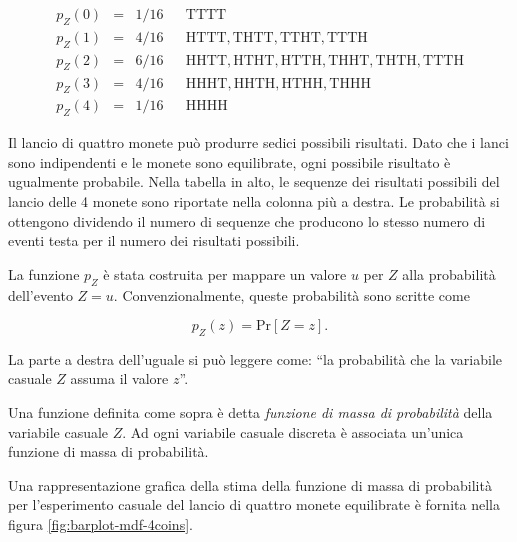 \documentclass[
  11pt,
]{krantz}
\theoremstyle{definition}
\theoremstyle{definition}
\theoremstyle{definition}
\theoremstyle{definition}
\theoremstyle{remark}
\begin{document}
\[
\begin{array}{rclll}
p_Z(0) & = & 1/16 & & \mathrm{TTTT}
\\
p_Z(1) & = & 4/16 & & \mathrm{HTTT, THTT, TTHT, TTTH}
\\
p_Z(2) & = & 6/16 & & \mathrm{HHTT, HTHT, HTTH, THHT, THTH, TTTH}
\\
p_Z(3) & = & 4/16 & & \mathrm{HHHT, HHTH, HTHH, THHH}
\\
p_Z(4) & = & 1/16 & & \mathrm{HHHH}
\end{array}
\]

Il lancio di quattro monete può produrre sedici possibili risultati. Dato che i lanci sono indipendenti e le monete sono equilibrate, ogni possibile risultato è ugualmente probabile. Nella tabella in alto, le sequenze dei risultati possibili del lancio delle 4 monete sono riportate nella colonna più a destra. Le probabilità si ottengono dividendo il numero di sequenze che producono lo stesso numero di eventi testa per il numero dei risultati possibili.

La funzione \(p_Z\) è stata costruita per mappare un valore \(u\) per \(Z\) alla probabilità dell'evento \(Z = u\). Convenzionalmente, queste probabilità sono scritte come

\[
p_Z(z) = \mbox{Pr}[Z = z].
\]

La parte a destra dell'uguale si può leggere come: ``la probabilità che la variabile casuale \(Z\) assuma il valore \(z\)''.

Una funzione definita come sopra è detta \emph{funzione di massa di probabilità} della variabile casuale \(Z\). Ad ogni variabile casuale discreta è associata un'unica funzione di massa di probabilità.

Una rappresentazione grafica della stima della funzione di massa di probabilità per l'esperimento casuale del lancio di quattro monete equilibrate è fornita nella figura \ref{fig:barplot-mdf-4coins}.
\end{document}
